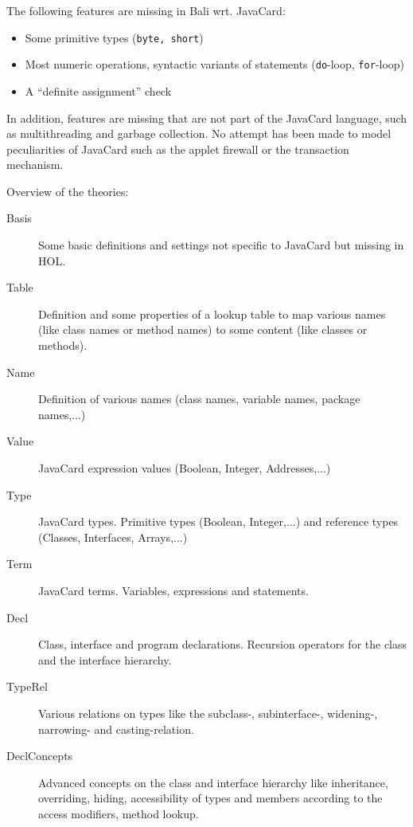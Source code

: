 \documentclass[11pt,a4paper]{book}
\begin{document}
The following features are missing in Bali wrt.{} JavaCard:
\begin{itemize}
\item Some primitive types (\texttt{byte, short})
\item Most numeric operations, syntactic variants of statements
  (\texttt{do}-loop, \texttt{for}-loop)
\item A ``definite assignment'' check
\end{itemize}

In addition, features are missing that are not part of the JavaCard
language, such as multithreading and garbage collection. No attempt
has been made to model peculiarities of JavaCard such as the applet
firewall or the transaction mechanism.


Overview of the theories:
\begin{description}
\item[Basis] 
Some basic definitions and settings not specific to JavaCard but missing in HOL.

\item[Table]
Definition and some properties of a lookup table to map various names 
(like class names or method names) to some content (like classes or methods).

\item[Name]
Definition of various names (class names, variable names, package names,...)

\item[Value]
JavaCard expression values (Boolean, Integer, Addresses,...)

\item[Type]
JavaCard types. Primitive types (Boolean, Integer,...) and reference types 
(Classes, Interfaces, Arrays,...)

\item[Term]
JavaCard terms. Variables, expressions and statements.

\item[Decl]
Class, interface and program declarations. Recursion operators for the
class and the interface hierarchy. 

\item[TypeRel]
Various relations on types like the subclass-, subinterface-, widening-, 
narrowing- and casting-relation.

\item[DeclConcepts]
Advanced concepts on the class and interface hierarchy like inheritance, 
overriding, hiding, accessibility of types and members according to the access 
modifiers, method lookup.


\end{description}
\end{document}
